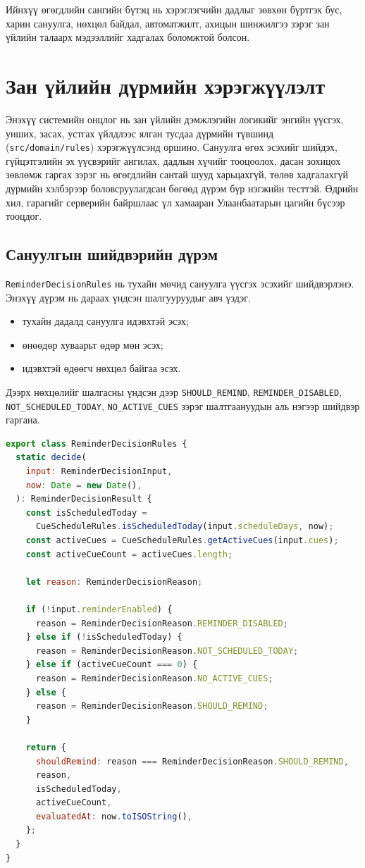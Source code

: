 Ийнхүү өгөгдлийн сангийн бүтэц нь хэрэглэгчийн дадлыг зөвхөн бүртгэх бус, харин сануулга, нөхцөл байдал, автоматжилт, ахицын шинжилгээ зэрэг зан үйлийн талаарх мэдээллийг хадгалах боломжтой болсон.

\section{Зан үйлийн дүрмийн хэрэгжүүлэлт}

Энэхүү системийн онцлог нь зан үйлийн дэмжлэгийн логикийг энгийн үүсгэх, унших, засах, устгах үйлдлээс ялган тусдаа дүрмийн түвшинд (\texttt{src/domain/rules}) хэрэгжүүлсэнд оршино. Сануулга өгөх эсэхийг шийдэх, гүйцэтгэлийн эх үүсвэрийг ангилах, дадлын хүчийг тооцоолох, дасан зохицох зөвлөмж гаргах зэрэг нь өгөгдлийн сантай шууд харьцахгүй, төлөв хадгалахгүй дүрмийн хэлбэрээр боловсруулагдсан бөгөөд дүрэм бүр нэгжийн тесттэй. Өдрийн хил, гарагийг серверийн байршлаас үл хамааран Улаанбаатарын цагийн бүсээр тооцдог.

\subsection{Сануулгын шийдвэрийн дүрэм}

\texttt{ReminderDecisionRules} нь тухайн мөчид сануулга үүсгэх эсэхийг шийдвэрлэнэ. Энэхүү дүрэм нь дараах үндсэн шалгууруудыг авч үздэг.

\begin{itemize}
    \item тухайн дадалд сануулга идэвхтэй эсэх;
    \item өнөөдөр хуваарьт өдөр мөн эсэх;
    \item идэвхтэй өдөөгч нөхцөл байгаа эсэх.
\end{itemize}

Дээрх нөхцөлийг шалгасны үндсэн дээр \texttt{SHOULD\_REMIND}, \texttt{REMINDER\_DISABLED}, \texttt{NOT\_SCHEDULED\_TODAY}, \texttt{NO\_ACTIVE\_CUES} зэрэг шалтгаануудын аль нэгээр шийдвэр гаргана.

\begin{lstlisting}[language=JavaScript, caption={Сануулгын шийдвэрийн дүрэм}]
export class ReminderDecisionRules {
  static decide(
    input: ReminderDecisionInput,
    now: Date = new Date(),
  ): ReminderDecisionResult {
    const isScheduledToday =
      CueScheduleRules.isScheduledToday(input.scheduleDays, now);
    const activeCues = CueScheduleRules.getActiveCues(input.cues);
    const activeCueCount = activeCues.length;

    let reason: ReminderDecisionReason;

    if (!input.reminderEnabled) {
      reason = ReminderDecisionReason.REMINDER_DISABLED;
    } else if (!isScheduledToday) {
      reason = ReminderDecisionReason.NOT_SCHEDULED_TODAY;
    } else if (activeCueCount === 0) {
      reason = ReminderDecisionReason.NO_ACTIVE_CUES;
    } else {
      reason = ReminderDecisionReason.SHOULD_REMIND;
    }

    return {
      shouldRemind: reason === ReminderDecisionReason.SHOULD_REMIND,
      reason,
      isScheduledToday,
      activeCueCount,
      evaluatedAt: now.toISOString(),
    };
  }
}
\end{lstlisting}

